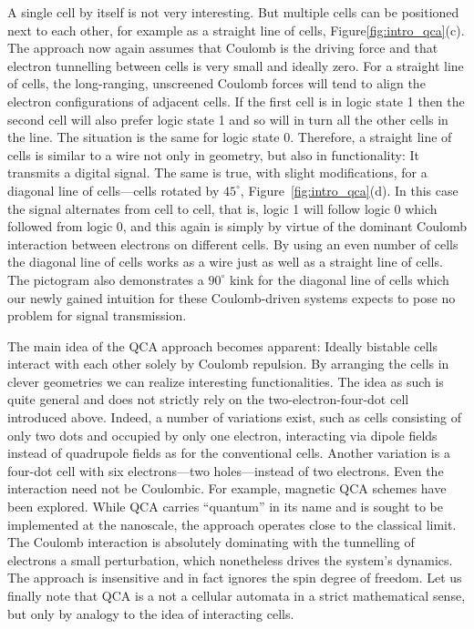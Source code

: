 A single cell by itself is not very interesting. But multiple cells can be
positioned next to each other, for example as a straight line of cells,
Figure\ref{fig:intro_qca}(c). The approach now again assumes that Coulomb is the
driving force and that electron tunnelling between cells is very small and
ideally zero. For a straight line of cells, the long-ranging, unscreened Coulomb
forces will tend to align the electron configurations of adjacent cells.  If the
first cell is in logic state 1 then the second cell will also prefer logic state
1 and so will in turn all the other cells in the line. The situation is the same
for logic state 0. Therefore, a straight line of cells is similar to a wire not
only in geometry, but also in functionality: It transmits a digital signal. The
same is true, with slight modifications, for a diagonal line of cells---cells
rotated by $45^{\circ}$, Figure~\ref{fig:intro_qca}(d). In this case the signal
alternates from cell to cell, that is, logic 1 will follow logic 0 which
followed from logic 0, and this again is simply by virtue of the dominant
Coulomb interaction between electrons on different cells. By using an even
number of cells the diagonal line of cells works as a wire just as well as a
straight line of cells. The pictogram also demonstrates a $90^{\circ}$ kink for
the diagonal line of cells which our newly gained intuition for these
Coulomb-driven systems expects to pose no problem for signal transmission.

The main idea of the QCA approach becomes apparent: Ideally bistable cells
interact with each other solely by Coulomb repulsion. By arranging the cells in
clever geometries we can realize interesting functionalities. The idea as such
is quite general and does not strictly rely on the two-electron-four-dot cell
introduced above. Indeed, a number of variations exist, such as cells consisting
of only two dots and occupied by only one electron, interacting via dipole
fields instead of quadrupole fields as for the conventional cells. Another
variation is a four-dot cell with six electrons---two holes---instead of two
electrons. Even the interaction need not be Coulombic. For example, magnetic QCA
schemes have been explored. While QCA carries ``quantum'' in its name and is
sought to be implemented at the nanoscale, the approach operates close to the
classical limit. The Coulomb interaction is absolutely dominating with the
tunnelling of electrons a small perturbation, which nonetheless drives the
system's dynamics.  The approach is insensitive and in fact ignores the spin
degree of freedom. Let us finally note that QCA is a not a cellular automata in
a strict mathematical sense, but only by analogy to the idea of interacting
cells.

